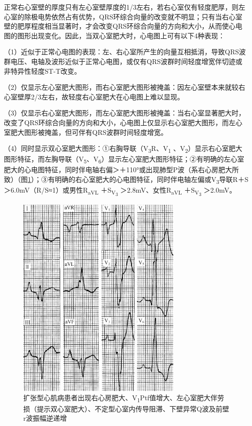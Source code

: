 正常右心室壁的厚度只有左心室壁厚度的1/3左右，若右心室仅有轻度肥厚，则左心室的除极电势依然占有优势，QRS环综合向量的改变就不明显；只有当右心室壁的肥厚程度相当显著时，才会改变QRS环综合向量的方向和大小，从而使心电图的图形出现变化。因此，当双心室肥大时，心电图上可有以下4种表现：

（1）近似于正常心电图的表现：左、右心室所产生的向量互相抵消，导致QRS波群电压、电轴及波形近似于正常心电图，或仅有QRS波群时间轻度增宽伴切迹或非特异性轻度ST-T改变。

（2）仅显示左心室肥大图形，而右心室肥大图形被掩盖：因左心室壁本来就较右心室壁厚2/3左右，故轻度右心室肥大在心电图上难以显现。

（3）仅显示右心室肥大图形，而左心室肥大图形被掩盖：当右心室显著肥大时，改变了QRS环综合向量的方向和大小，心电图上仅显示右心室肥大图形，而左心室肥大图形被掩盖，但可伴有QRS波群时间轻度增宽。

（4）同时显示双心室肥大图形：①右胸导联（V\textsubscript{3}R、V\textsubscript{1} 、V\textsubscript{2}）显示右心室肥大图形特征，而左胸导联（V\textsubscript{5}、V\textsubscript{6}）显示左心室肥大图形特征；②有明确的左心室肥大的心电图特征，同时伴电轴右偏＞＋110°或出现肺型P波（系右心房肥大所致）（图\ref{fig36-12}）；③有明确的右心室肥大的心电图特征，同时伴电轴左偏或V\textsubscript{3}导联R＋S＞6.0mV（R/S≈1）或男性R\textsubscript{aVL}
＋S\textsubscript{V\textsubscript{3}} ＞2.8mV、女性R\textsubscript{aVL}
＋S\textsubscript{V\textsubscript{3}} ＞2.0mV。

\begin{figure}[!htbp]
 \centering
 \includegraphics[width=3.21875in,height=4in]{./images/Image00584.jpg}
 \captionsetup{justification=centering}
 \caption{扩张型心肌病患者出现右心房肥大、V\textsubscript{1}Ptf值增大、左心室肥大伴劳损（提示双心室肥大）、不定型心室内传导阻滞、下壁异常Q波及前壁r波振幅逆递增}
 \label{fig36-12}
  \end{figure} 


